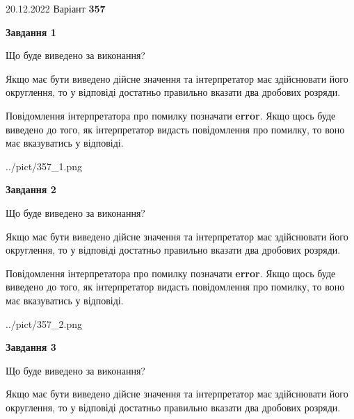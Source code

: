 \documentclass[12pt, ukrainian]{article}
\begin{document}
{20.12.2022 Варіант \No \textbf { 357 }\par}
{
\begin {Large}

{\begin {center}\textbf{Завдання 1}\end {center}}\par
Що буде виведено за виконання? \par

Якщо має бути виведено дійсне значення та інтерпретатор має здійснювати його округлення, 
то у відповіді достатньо правильно вказати два дробових розряди.

Повідомлення інтерпретатора про помилку позначати \textbf{error}.
Якщо щось буде виведено до того, як інтерпретатор видасть повідомлення про помилку, 
то воно має вказуватись у відповіді. \par

\begin{center}
	{../pict/357_1.png}
\end{center}
\newpage

{\begin {center}\textbf{Завдання 2}\end {center}}\par
Що буде виведено за виконання? \par

Якщо має бути виведено дійсне значення та інтерпретатор має здійснювати його округлення, 
то у відповіді достатньо правильно вказати два дробових розряди.

Повідомлення інтерпретатора про помилку позначати \textbf{error}.
Якщо щось буде виведено до того, як інтерпретатор видасть повідомлення про помилку, 
то воно має вказуватись у відповіді. \par

\begin{center}
	{../pict/357_2.png}
\end{center}
\newpage

{\begin {center}\textbf{Завдання 3}\end {center}}\par
Що буде виведено за виконання? \par

Якщо має бути виведено дійсне значення та інтерпретатор має здійснювати його округлення, 
то у відповіді достатньо правильно вказати два дробових розряди.


\end{Large}}
\end{document}
